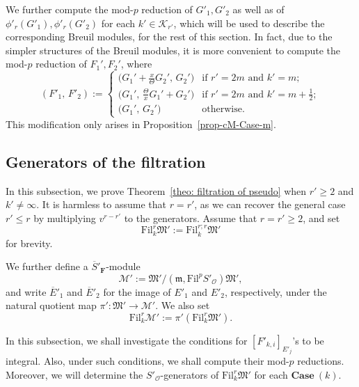 \documentclass[11pt]{amsart}
\theoremstyle{definition}
\numberwithin{equation}{subsection}
\theoremstyle{plain}
\theoremstyle{plain}
\theoremstyle{plain}
\theoremstyle{plain}
\theoremstyle{plain}
\theoremstyle{plain}
\theoremstyle{plain}
\theoremstyle{plain}
\theoremstyle{plain}
\theoremstyle{plain}
\theoremstyle{plain}
\theoremstyle{plain}
\theoremstyle{definition}
\theoremstyle{definition}
\theoremstyle{definition}
\theoremstyle{remark}
\renewcommand{\(}{\textup{(}}
\renewcommand{\)}{\textup{)}}
\newcommand{\F}{\mathbf{F}}
\newcommand{\barS}{\overline{S}}
\newcommand{\cM}{\mathcal{M}}
\newcommand{\fM}{\mathfrak{M}}
\newcommand{\fm}{\mathfrak{m}}
\newcommand{\Fil}{\mathrm{Fil}}
\newcommand{\cO}{\mathcal{O}}
\newcommand{\barE}{\overline{E}}
\newcommand{\cK}{\mathcal{K}}
\begin{document}
We further compute the mod-$p$ reduction of $G'_1,G'_2$ as well as of $\phi'_r(G'_1),\phi'_r(G'_2)$ for each $k'\in\cK_{r'}$, which will be used to describe the corresponding Breuil modules, for the rest of this section. In fact, due to the simpler structures of the Breuil modules, it is more convenient to compute the mod-$p$ reduction of $F_1',F_2'$, where 
\begin{equation*}
    (F'_1,\, F'_2):=
    \begin{cases}
        \big(G_1'+\frac{x}{\Theta}G_2',\,G_2'  \big)  & \mbox{if }r'=2m\mbox{ and }k'=m; \\
        \big(G_1',\,\frac{\Theta}{x}G_1'+G_2'\big) & \mbox{if }r'=2m\mbox{ and }k'=m+\tfrac{1}{2}; \\
        \big(G_1',\,G_2'\big)  & \mbox{otherwise. }
    \end{cases}
\end{equation*}
This modification only arises in Proposition~\ref{prop-cM-Case-m}.




\subsection{Generators of the filtration}\label{subsec: Generators of the filtration}
In this subsection, we prove Theorem~\ref{theo: filtration of pseudo} when $r'\geq 2$ and $k'\neq\infty$. It is harmless to assume that $r=r'$, as we can recover the general case $r'\leq r$ by multiplying $v^{r-r'}$ to the generators. Assume that $r=r'\geq 2$, and set
    \begin{equation*}
        \Fil^r_{k}\fM':=\Fil^{r;r}_{k}\fM'
    \end{equation*}
for brevity.

We further define a $\barS'_\F$-module
    \begin{equation*}
        \cM':=\fM'/(\fm,\Fil^p S'_\cO)\fM',
    \end{equation*}
and write $\barE'_1$ and $\barE'_2$ for the image of $E'_1$ and $E'_2$, respectively, under the natural quotient map $\pi':\fM'\to\cM'$. We also set
$$\Fil^r_{k}\cM':=\pi'(\Fil^r_{k}\fM').$$


In this subsection, we shall investigate the conditions for $[F'_{k,i}]_{E'_j}$'s to be integral. Also, under such conditions, we shall compute their mod-$p$ reductions. Moreover, we will determine the $S'_\cO$-generators of $\Fil^r_{k}\fM'$ for each $\mathbf{Case}~(k)$.
\end{document}
